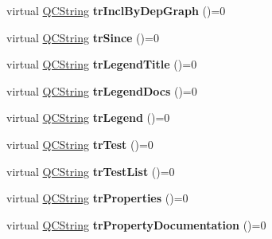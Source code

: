 \begin{DoxyCompactItemize}
\item 
\hypertarget{class_translator_a1f359627b6aaccf4d29d0da7454775f1}{virtual \hyperlink{class_q_c_string}{Q\-C\-String} {\bfseries tr\-Incl\-By\-Dep\-Graph} ()=0}\label{class_translator_a1f359627b6aaccf4d29d0da7454775f1}

\item 
\hypertarget{class_translator_a102a0b1ba7e5f631abf221927595995b}{virtual \hyperlink{class_q_c_string}{Q\-C\-String} {\bfseries tr\-Since} ()=0}\label{class_translator_a102a0b1ba7e5f631abf221927595995b}

\item 
\hypertarget{class_translator_a7e70ba21a9b01d4fdb34e298442f8379}{virtual \hyperlink{class_q_c_string}{Q\-C\-String} {\bfseries tr\-Legend\-Title} ()=0}\label{class_translator_a7e70ba21a9b01d4fdb34e298442f8379}

\item 
\hypertarget{class_translator_a8b130e06ff2bea8a90db9261902d9a63}{virtual \hyperlink{class_q_c_string}{Q\-C\-String} {\bfseries tr\-Legend\-Docs} ()=0}\label{class_translator_a8b130e06ff2bea8a90db9261902d9a63}

\item 
\hypertarget{class_translator_a8dd5012bafd8f57c3910e0cecd06e6db}{virtual \hyperlink{class_q_c_string}{Q\-C\-String} {\bfseries tr\-Legend} ()=0}\label{class_translator_a8dd5012bafd8f57c3910e0cecd06e6db}

\item 
\hypertarget{class_translator_abe020677ac09ecbe388da5b967e3d524}{virtual \hyperlink{class_q_c_string}{Q\-C\-String} {\bfseries tr\-Test} ()=0}\label{class_translator_abe020677ac09ecbe388da5b967e3d524}

\item 
\hypertarget{class_translator_a5e1f6aeb0d42b93e1cce80b81e0d81da}{virtual \hyperlink{class_q_c_string}{Q\-C\-String} {\bfseries tr\-Test\-List} ()=0}\label{class_translator_a5e1f6aeb0d42b93e1cce80b81e0d81da}

\item 
\hypertarget{class_translator_a92d5accf0a7fccbe95a8f59ade02df19}{virtual \hyperlink{class_q_c_string}{Q\-C\-String} {\bfseries tr\-Properties} ()=0}\label{class_translator_a92d5accf0a7fccbe95a8f59ade02df19}

\item 
\hypertarget{class_translator_a756ed0cdb4915392aa9f9419edf78abf}{virtual \hyperlink{class_q_c_string}{Q\-C\-String} {\bfseries tr\-Property\-Documentation} ()=0}\label{class_translator_a756ed0cdb4915392aa9f9419edf78abf}


\end{DoxyCompactItemize}
